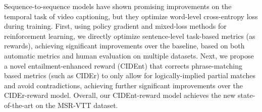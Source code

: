 Sequence-to-sequence models have shown promising  improvements on the temporal task of video captioning, but they optimize word-level cross-entropy loss during training. First, using policy gradient and mixed-loss methods for reinforcement learning,  we directly optimize sentence-level task-based metrics (as rewards), achieving significant improvements over the baseline, based on both automatic metrics and human evaluation on multiple datasets. Next, we propose a novel entailment-enhanced reward (CIDEnt) that corrects phrase-matching based metrics (such as CIDEr) to only allow for logically-implied partial matches and avoid contradictions, achieving further significant improvements over the CIDEr-reward model. Overall, our CIDEnt-reward model achieves the new state-of-the-art on the MSR-VTT dataset.
